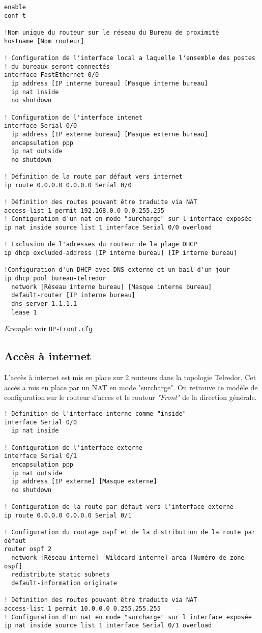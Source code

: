 \documentclass{article}
\newcommand{\tlr}{Telredor\xspace}
\newcommand{\seefile}[1]{
  \begin{center}
  \begin{minipage}{0.9\textwidth}
    \emph{Exemple}: voir \texttt{\href{https://github.com/EpicKiwi/Wide-Network-Project-Cesi-A4/blob/master/network/#1}{#1}}
  \end{minipage}
  \end{center}
}
\begin{document}
\begin{lstlisting}[caption=Configuration d'un routeur de bureau de proximité]
enable
conf t

!Nom unique du routeur sur le réseau du Bureau de proximité
hostname [Nom routeur]

! Configuration de l'interface local a laquelle l'ensemble des postes
! du bureaux seront connectés
interface FastEthernet 0/0
  ip address [IP interne bureau] [Masque interne bureau]
  ip nat inside
  no shutdown

! Configuration de l'interface intenet
interface Serial 0/0
  ip address [IP externe bureau] [Masque externe bureau]
  encapsulation ppp
  ip nat outside
  no shutdown

! Définition de la route par défaut vers internet
ip route 0.0.0.0 0.0.0.0 Serial 0/0

! Définition des routes pouvant être traduite via NAT
access-list 1 permit 192.168.0.0 0.0.255.255
! Configuration d'un nat en mode "surcharge" sur l'interface exposée
ip nat inside source list 1 interface Serial 0/0 overload

! Exclusion de l'adresses du routeur de la plage DHCP
ip dhcp excluded-address [IP interne bureau] [IP interne bureau]

!Configuration d'un DHCP avec DNS externe et un bail d'un jour
ip dhcp pool bureau-telredor
  network [Réseau interne bureau] [Masque interne bureau]
  default-router [IP interne bureau]
  dns-server 1.1.1.1
  lease 1
\end{lstlisting}

\seefile{BP-Front.cfg}

\subsection{Accès à internet}

L'accès à internet est mis en place sur 2 routeurs dans la topologie \tlr.
Cet accès a mis en place par un NAT en mode "surcharge".
On retrouve ce modèle de configuration sur le routeur d'acces et le routeur \emph{"Front"} de la direction générale.

\begin{lstlisting}[caption=Configuration d'un accès internet avec NAT]
! Définition de l'interface interne comme "inside"
interface Serial 0/0
  ip nat inside

! Configuration de l'interface externe
interface Serial 0/1
  encapsulation ppp
  ip nat outside
  ip address [IP externe] [Masque externe]
  no shutdown

! Configuration de la route par défaut vers l'interface externe
ip route 0.0.0.0 0.0.0.0 Serial 0/1

! Configuration du routage ospf et de la distribution de la route par défaut
router ospf 2
  network [Réseau interne] [Wildcard interne] area [Numéro de zone ospf]
  redistribute static subnets
  default-information originate

! Définition des routes pouvant être traduite via NAT
access-list 1 permit 10.0.0.0 0.255.255.255
! Configuration d'un nat en mode "surcharge" sur l'interface exposée
ip nat inside source list 1 interface Serial 0/1 overload
\end{lstlisting}
\end{document}
